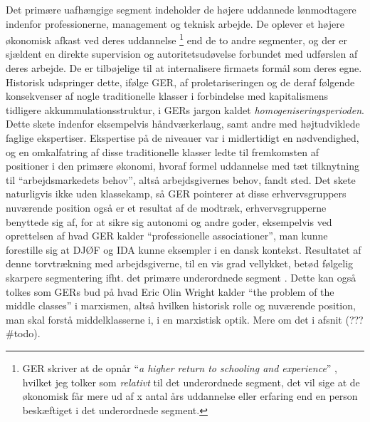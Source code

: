 Det primære uafhængige segment \label{GER kontrol og intern arb marked} indeholder de højere uddannede lønmodtagere indenfor professionerne, management og teknisk arbejde. De oplever et højere økonomisk afkast ved deres uddannelse%
% 
\footnote{GER skriver at de opnår “\emph{a higher return to schooling and experience}” \parencite[202]{Gordon1982}, hvilket jeg tolker som \emph{relativt} til det underordnede segment, det vil sige at de økonomisk får mere ud af x antal års uddannelse eller erfaring end en person beskæftiget i det underordnede segment.}%
%
end de to andre segmenter, og der er sjældent en direkte supervision og autoritetsudøvelse forbundet med udførslen af deres arbejde. De er tilbøjelige til at internalisere firmaets formål som deres egne.
Historisk udspringer dette, ifølge GER, af proletariseringen og de deraf følgende konsekvenser af nogle traditionelle klasser i forbindelse med kapitalismens tidligere akkummulationsstruktur, i GERs jargon kaldet \emph{homogeniseringsperioden}.  Dette skete indenfor eksempelvis håndværkerlaug, samt andre med højtudviklede faglige ekspertiser. Ekspertise på de niveauer var i midlertidigt en nødvendighed, og en omkalfatring af disse traditionelle klasser ledte til fremkomsten af positioner i den primære økonomi, hvoraf formel uddannelse med tæt tilknytning til “arbejdsmarkedets behov”, altså arbejdsgivernes behov, fandt sted. Det skete naturligvis ikke uden klassekamp, så GER pointerer at disse erhvervsgruppers nuværende position også er et resultat af de modtræk, erhvervsgrupperne benyttede sig af, for at sikre sig autonomi og andre goder, eksempelvis ved oprettelsen af hvad GER kalder “professionelle associationer”, man kunne forestille sig at DJØF og IDA kunne eksempler i en dansk kontekst. Resultatet af denne torvtrækning med arbejdsgiverne, til en vis grad vellykket, betød følgelig skarpere segmentering ifht. det primære underordnede segment \parencite[202f]{Gordon1982}.
Dette kan også tolkes som GERs bud på hvad Eric Olin Wright kalder “the problem of the middle classes” i marxismen, altså hvilken historisk rolle og nuværende position, man skal forstå middelklasserne i, i en marxistisk optik. Mere om det i afsnit (??? \#todo).

